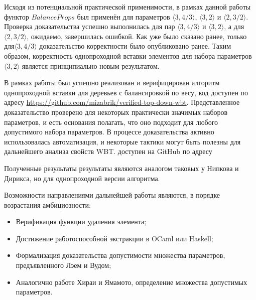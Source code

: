\documentclass[a4paper,14pt]{extarticle}
\begin{document}
Исходя из потенциальной практической применимости,
в рамках данной работы 
функтор \( BalanceProps \) был применён
для параметров
\( \langle 3, 4/3 \rangle \), \( \langle 3, 2 \rangle \)
и \( \langle 2, 3/2 \rangle \).
Проверка доказательства успешно выполнилась
для пар \( \langle 3, 4/3 \rangle \)
и \( \langle 3, 2 \rangle \),
а для \( \langle 2, 3/2 \rangle \),
ожидаемо, завершилась ошибкой.
Как уже было сказано ранее,
только для\( \langle 3, 4/3 \rangle \) 
доказательство корректности было опубликовано ранее.
Таким образом, корректность
однопроходной вставки элементов
для набора параметров \( \langle 3, 2 \rangle \)
является принципиально новым результатом.

\clearpage
{}

В рамках работы был успешно реализован и верифицирован алгоритм однопроходной
вставки для деревьев с балансировкой по весу,
код доступен по адресу \url{https://github.com/mizabrik/verified-top-down-wbt}.
Представленное доказательство проверено для некоторых практически значимых наборов параметров,
и есть основания полагать, что оно подходит для любого допустимого набора параметров.
В процессе доказательства активно использовалась автоматизация,
и некоторые тактики могут быть полезны для дальнейшего анализа свойств WBT.
 доступен на GitHub
по адресу 

Полученные результаты результаты
являются аналогом таковых у Нипкова и Дирикса\cite{nipkow},
но для однопроходной версии алгоритма.

Возможности направлениями дальнейшей работы являются,
в порядке возрастания амбициозности:
\begin{itemize}
  \item Верификация функции удаления элемента;
  \item Достижение работоспособной экстракции в OCaml или Haskell;
  \item Формализация доказательства допустимости множества параметров,
    предъявленного Лэем и Вудом;
  \item Аналогично работе Хираи и Ямамото, определение множества допустимых
    параметров.
\end{itemize}

\clearpage
\printbibliography%
\end{document}

